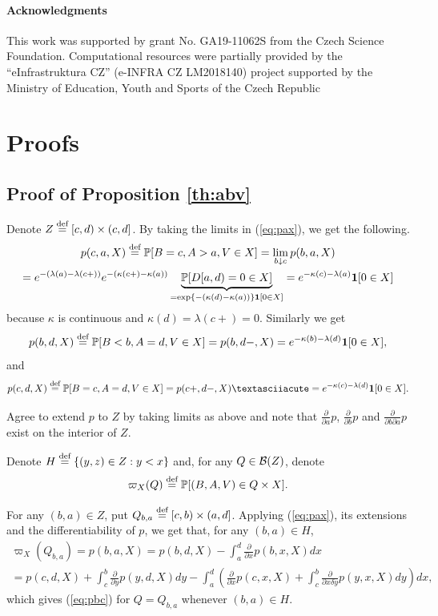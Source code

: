 \documentclass{aptpub}
\begin{document}
\paragraph*{Acknowledgments} This work was supported by grant No. GA19-11062S from the Czech Science Foundation. Computational resources were partially provided by the ``eInfrastruktura CZ'' (e-INFRA CZ LM2018140) project supported by the Ministry of Education, Youth and
Sports of the Czech Republic

%
\footnotesize
%

\appendix



\section{Proofs}

\subsection{Proof of Proposition \ref{th:abv}}
\label{app:abv}


Denote $Z \stackrel{\text{def}}{=} [c,d)\times(c,d]$. 
By taking the limits in (\ref{eq:pax}), we get the following.
\begin{multline}
p(c,a,X)\stackrel{\text{def}}{=}\mathbb{P}[B=c,A>a,V\in X]=
\lim_{b\downarrow c} p(b,a,X) \\
=e^{-(\lambda(a)-\lambda(c+))}e^{-(\kappa(c+)-\kappa(a))}
\underbrace{\mathbb{P}[D[a,d)=0\in X]}_{=\exp\{-(\kappa(d)-\kappa(a))\}\mathbf{1}[0 \in X]}=e^{-\kappa(c)-\lambda(a)}\mathbf{1}[0 \in X]
\label{eq:pca}
\end{multline}
because $\kappa$ is continuous and $\kappa(d)=\lambda(c+)=0$. Similarly we get
$$
p(b,d,X)\stackrel{\text{def}}{=}\mathbb{P}[B <b,A=d,V \in X]=p(b,d-,X) = e^{-\kappa(b)-\lambda(d)}\mathbf{1}[0 \in X],
$$
and
\[
p(c,d,X)\defined\P[B=c,A=d,V \in X]=p(c+,d-,X)´=e^{-\kappa(c)-\lambda(d)}\charf[0 \in X].
\]

Agree to extend $p$ to $Z$ by taking limits as above and note that $\frac\partial{\partial a}p$, $\frac\partial{\partial b}p$ and $\frac\partial{\partial b\partial a}p$ exist on the interior of $Z$.

Denote $H\stackrel{\text{def}}{=}\{(y,z)\in Z:y<x\}$ and, for any $Q\in \mathcal{B}(Z)$, denote $$\varpi_X(Q)\stackrel{\text{def}}{=}\mathbb{P}[(B,A,V)\in Q \times X].$$

For any $(b,a)\in Z$, put $Q_{b,a}\stackrel{\text{def}}{=}[c,b)\times(a,d]$. Applying (\ref{eq:pax}), its extensions and the differentiability of $p$, we get that, for any $(b,a)\in H$,
\begin{multline*}
\varpi_X(Q_{b,a})=p(b,a,X)=p(b,d,X)-\int_{a}^{d}\frac{\partial}{\partial x}p(b,x,X)dx\\
=p(c,d,X)+\int_{c}^{b}\frac{\partial}{\partial y}p(y,d,X)dy-\int_{a}^{d}\left(\frac{\partial}{\partial x}p(c,x,X)+\int_{c}^{b}\frac{\partial}{\partial x\delta y}p(y,x,X)dy\right)dx,
\end{multline*}
which gives (\ref{eq:pbc}) for $Q=Q_{b,a}$ whenever $(b,a)\in H$.
\end{document}
